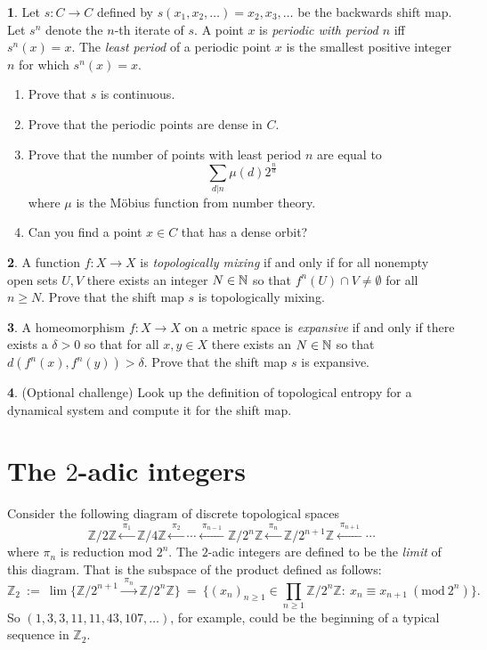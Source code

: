 \documentclass[11pt]{article}
\theoremstyle{definition}
\newtheorem{problem}{}
\newcommand{\bp}{\begin{problem}}
\newcommand{\ep}{\end{problem}\bigskip}
\theoremstyle{theorem}
\newcommand{\Z}{\mathbb{Z}}%
\begin{document}
\bp Let $s:C \to C$ defined by $s(x_1, x_2, \ldots ) = x_2, x_3, \ldots$ be the backwards shift map.  Let $s^n$ denote the $n$-th iterate of $s$.  A point $x$ is \emph{periodic with period $n$} iff $s^n(x)=x$.  The \emph{least period} of a periodic point $x$ is the smallest positive integer $n$ for which $s^n(x)=x$.
\begin{enumerate}[label=(\alph*)]
\item Prove that $s$ is continuous.
\item Prove that the periodic points are dense in $C$.
\item Prove that the number of points with least period $n$ are equal to 
\[\sum_{d \vert n} \mu(d)2^{\frac{n}{d}}
\]
where $\mu$ is the M\"obius function from number theory.
\item Can you find a point $x\in C$ that has a dense orbit?
\end{enumerate}
\ep

\bp A function $f:X \to X$ is \emph{topologically mixing} if and only if for all nonempty open sets $U, V$ there exists an integer $N\in \mathbb{N}$ so that $f^n(U)\cap V \neq \emptyset$ for all $n\geq N$.  Prove that the shift map $s$ is topologically mixing.
\ep


\bp A homeomorphism $f:X \to X$ on a metric space is \emph{expansive} if and only if there exists a $\delta>0$ so that for all $x,y\in X$ there exists an $N\in \mathbb{N}$ so that $d(f^n(x),f^n(y))>\delta.$  Prove that the shift map $s$ is expansive.
\ep

\bp (Optional challenge) Look up the definition of topological entropy for a dynamical system and compute it for the shift map.
\ep


\section*{The $2$-adic integers}

Consider the following diagram of discrete topological spaces 
\[
\Z/2\Z \xleftarrow{\;\pi_1\;} \Z/4\Z 
\xleftarrow{\;\pi_2\;} \cdots 
\xleftarrow{\;\pi_{n-1}\;}\Z/2^{n}\Z
\xleftarrow{\;\pi_{n}\;} \Z/2^{n+1}\Z 
\xleftarrow{\;\pi_{n+1}\;} \cdots
\]
where $\pi_n$ is reduction mod $2^n$.  The $2$-adic integers are defined to be the \emph{limit} of this diagram.  That is the subspace of the product defined as follows:
\[\Z_2\ :=\ \lim \{\Z/2^{n+1}\xrightarrow{\;\pi_{n}\;} \Z/2^n \Z\}\ = \ \Big\{(x_n)_{n\ge1}\in\prod_{n\ge1}\Z/2^n\Z:\ x_n\equiv x_{n+1}\ (\mathrm{mod}\ 2^n)\Big\}.\]
So $(1,3,3,11,11,43,107, \ldots)$, for example,  could be the beginning of a typical sequence in $\Z_2$.
\end{document}
